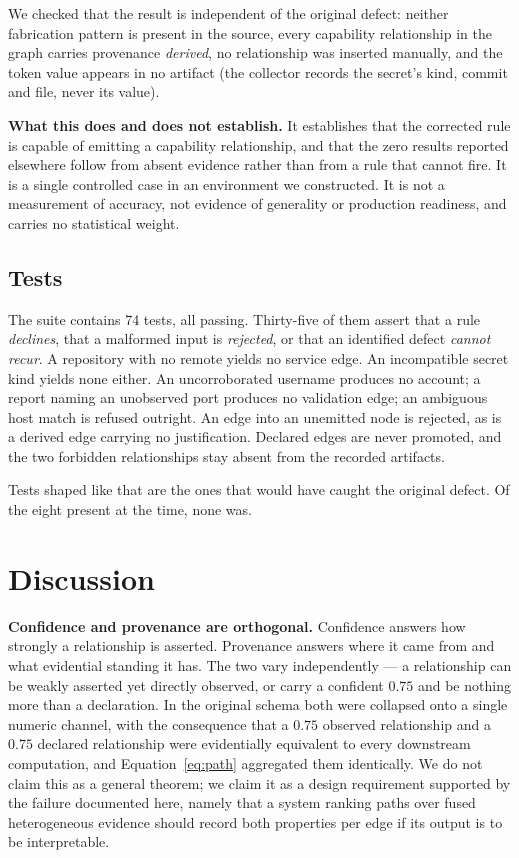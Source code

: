 \documentclass[11pt,a4paper]{article}
\begin{document}
We checked that the result is independent of the original defect: neither
fabrication pattern is present in the source, every capability relationship in
the graph carries provenance \emph{derived}, no relationship was inserted
manually, and the token value appears in no artifact (the collector records the
secret's kind, commit and file, never its value).

\textbf{What this does and does not establish.} It establishes that the
corrected rule is capable of emitting a capability relationship, and that the
zero results reported elsewhere follow from absent evidence rather than from a
rule that cannot fire. It is a single controlled case in an environment we
constructed. It is not a measurement of accuracy, not evidence of generality or
production readiness, and carries no statistical weight.

\subsection{Tests}
The suite contains 74 tests, all passing. Thirty-five of them assert that a rule \emph{declines}, that a malformed input is \emph{rejected}, or that an identified defect \emph{cannot recur}. A repository with no remote yields no service edge. An incompatible secret kind yields none either. An uncorroborated username produces no account; a report naming an unobserved port produces no validation edge; an ambiguous host match is refused outright. An edge into an unemitted node is rejected, as is a derived edge carrying no justification. Declared edges are never promoted, and the two forbidden relationships stay absent from the recorded artifacts.

Tests shaped like that are the ones that would have caught the original defect. Of the eight present at the time, none was.

\section{Discussion}\label{sec:discussion}
\textbf{Confidence and provenance are orthogonal.} Confidence answers how strongly a relationship is asserted. Provenance answers where it came from and what evidential standing it has. The two vary independently --- a relationship can be weakly asserted yet directly observed, or carry a confident $0.75$ and be nothing more than a declaration. In the original schema both were collapsed onto a single numeric channel, with the consequence that a $0.75$ observed relationship and a $0.75$ declared relationship were evidentially equivalent to every downstream computation, and Equation~\eqref{eq:path} aggregated them identically. We do not claim this as a general theorem; we claim it as a design requirement supported by the failure documented here, namely that a system ranking paths over fused heterogeneous evidence should record both properties per edge if its output is to be interpretable.
\end{document}
